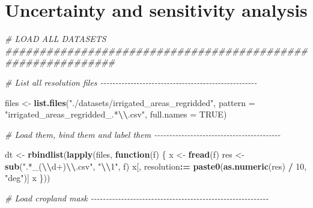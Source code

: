 \documentclass[
  11pt,
]{article}
\newenvironment{Shaded}{\begin{snugshade}}{\end{snugshade}}
\newcommand{\AttributeTok}[1]{\textcolor[rgb]{0.13,0.29,0.53}{#1}}
\newcommand{\CommentTok}[1]{\textcolor[rgb]{0.56,0.35,0.01}{\textit{#1}}}
\newcommand{\ConstantTok}[1]{\textcolor[rgb]{0.56,0.35,0.01}{#1}}
\newcommand{\ControlFlowTok}[1]{\textcolor[rgb]{0.13,0.29,0.53}{\textbf{#1}}}
\newcommand{\DecValTok}[1]{\textcolor[rgb]{0.00,0.00,0.81}{#1}}
\newcommand{\FunctionTok}[1]{\textcolor[rgb]{0.13,0.29,0.53}{\textbf{#1}}}
\newcommand{\NormalTok}[1]{#1}
\newcommand{\OtherTok}[1]{\textcolor[rgb]{0.56,0.35,0.01}{#1}}
\newcommand{\SpecialCharTok}[1]{\textcolor[rgb]{0.81,0.36,0.00}{\textbf{#1}}}
\newcommand{\StringTok}[1]{\textcolor[rgb]{0.31,0.60,0.02}{#1}}
\begin{document}
\newpage

\section{Uncertainty and sensitivity
analysis}\label{uncertainty-and-sensitivity-analysis}

\begin{Shaded}
\begin{Highlighting}[]
\CommentTok{\# LOAD ALL DATASETS \#\#\#\#\#\#\#\#\#\#\#\#\#\#\#\#\#\#\#\#\#\#\#\#\#\#\#\#\#\#\#\#\#\#\#\#\#\#\#\#\#\#\#\#\#\#\#\#\#\#\#\#\#\#\#\#\#\#\#\#}

\CommentTok{\# List all resolution files {-}{-}{-}{-}{-}{-}{-}{-}{-}{-}{-}{-}{-}{-}{-}{-}{-}{-}{-}{-}{-}{-}{-}{-}{-}{-}{-}{-}{-}{-}{-}{-}{-}{-}{-}{-}{-}{-}{-}{-}{-}{-}{-}{-}{-}{-}{-}{-}{-}{-}{-}{-}}

\NormalTok{files }\OtherTok{\textless{}{-}} \FunctionTok{list.files}\NormalTok{(}\StringTok{"./datasets/irrigated\_areas\_regridded"}\NormalTok{,}
                    \AttributeTok{pattern =} \StringTok{"irrigated\_areas\_regridded\_.*}\SpecialCharTok{\textbackslash{}\textbackslash{}}\StringTok{.csv"}\NormalTok{,}
                    \AttributeTok{full.names =} \ConstantTok{TRUE}\NormalTok{)}

\CommentTok{\# Load them, bind them and label them {-}{-}{-}{-}{-}{-}{-}{-}{-}{-}{-}{-}{-}{-}{-}{-}{-}{-}{-}{-}{-}{-}{-}{-}{-}{-}{-}{-}{-}{-}{-}{-}{-}{-}{-}{-}{-}{-}{-}{-}{-}{-}}

\NormalTok{dt }\OtherTok{\textless{}{-}} \FunctionTok{rbindlist}\NormalTok{(}\FunctionTok{lapply}\NormalTok{(files, }\ControlFlowTok{function}\NormalTok{(f) \{}
\NormalTok{  x }\OtherTok{\textless{}{-}} \FunctionTok{fread}\NormalTok{(f)}
\NormalTok{  res }\OtherTok{\textless{}{-}} \FunctionTok{sub}\NormalTok{(}\StringTok{".*\_(}\SpecialCharTok{\textbackslash{}\textbackslash{}}\StringTok{d+)}\SpecialCharTok{\textbackslash{}\textbackslash{}}\StringTok{.csv"}\NormalTok{, }\StringTok{"}\SpecialCharTok{\textbackslash{}\textbackslash{}}\StringTok{1"}\NormalTok{, f)}
\NormalTok{  x[, resolution}\SpecialCharTok{:=} \FunctionTok{paste0}\NormalTok{(}\FunctionTok{as.numeric}\NormalTok{(res) }\SpecialCharTok{/} \DecValTok{10}\NormalTok{, }\StringTok{"deg"}\NormalTok{)]}
\NormalTok{  x}
\NormalTok{\}))}

\CommentTok{\# Load cropland mask {-}{-}{-}{-}{-}{-}{-}{-}{-}{-}{-}{-}{-}{-}{-}{-}{-}{-}{-}{-}{-}{-}{-}{-}{-}{-}{-}{-}{-}{-}{-}{-}{-}{-}{-}{-}{-}{-}{-}{-}{-}{-}{-}{-}{-}{-}{-}{-}{-}{-}{-}{-}{-}{-}{-}{-}{-}{-}{-}}


\end{Highlighting}
\end{Shaded}
\end{document}
